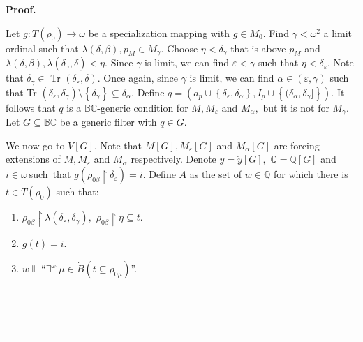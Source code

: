\documentclass{article}
\newenvironment{proof}[1][Proof]{\noindent\textbf{#1.} }{\ \rule{0.5em}{0.5em}}
\begin{document}
\begin{proof}
\qquad\qquad\qquad\qquad\ \ \ \ \qquad\ \qquad\ \ \ \ \ \qquad\ \ \ \ \ 

Let $g:T\left(  \rho_{0}\right)  \longrightarrow\omega$ be a specialization
mapping with $g\in M_{0}.$ Find $\gamma<\omega^{2}$ a limit ordinal such that
$\lambda\left(  \delta,\beta\right)  ,p_{M}\in M_{\gamma}$. Choose
$\eta<\delta_{\gamma}$ that is above $p_{M}$ and $\lambda\left(  \delta
,\beta\right)  ,\lambda\left(  \delta_{\gamma},\delta\right)  <\eta.$ Since
$\gamma$ is limit, we can find $\varepsilon<\gamma$ such that $\eta
<\delta_{\varepsilon}.$ Note that $\delta_{\gamma}\in$ \textsf{Tr}%
$(\delta_{\varepsilon},\delta).$ Once again, since $\gamma$ is limit, we can
find $\alpha\in\left(  \varepsilon,\gamma\right)  $ such that \textsf{Tr}%
$(\delta_{\varepsilon},\delta_{\gamma})\setminus\left\{  \delta_{\gamma
}\right\}  \subseteq\delta_{\alpha}.$ Define $q=(a_{p}\cup\left\{
\delta_{\varepsilon},\delta_{\alpha}\right\}  ,I_{p}\cup\left\{
(\delta_{\alpha},\delta_{\gamma}]\right\}  ).$ It follows that $q$ is a
$\mathbb{BC}$-generic condition for $M,M_{\varepsilon}$ and $M_{\alpha},$ but
it is not for $M_{\gamma}.$ Let $G\subseteq\mathbb{BC}$ be a generic filter
with $q\in G.$

\qquad\qquad\qquad

We now go to $V\left[  G\right]  .$ Note that $M\left[  G\right]
,M_{\varepsilon}\left[  G\right]  $ and $M_{\alpha}\left[  G\right]  $ are
forcing extensions of $M,M_{\varepsilon}$ and $M_{\alpha}$ respectively.
Denote $y=\dot{y}\left[  G\right]  ,$ $\mathbb{Q=\dot{Q}}\left[  G\right]  $
and $i\in\omega\ $such\ that $g\left(  \rho_{0\beta}\upharpoonright
\delta_{\varepsilon}\right)  =i.$ Define $A$ as the set of $w\in\mathbb{Q}$
for which there is $t\in T\left(  \rho_{0}\right)  $ such that:

\begin{enumerate}
\item $\rho_{0\beta}\upharpoonright\lambda\left(  \delta_{\varepsilon}%
,\delta_{\gamma}\right)  ,$ $\rho_{0\beta}\upharpoonright\eta\subseteq t.$

\item $g\left(  t\right)  =i.$

\item $w\Vdash$\textquotedblleft$\exists^{\omega_{1}}\mu\in\dot{B}\left(
t\subseteq\rho_{0\mu}\right)  $\textquotedblright.
\end{enumerate}

\qquad\ \qquad\ \ \ \ 


\end{proof}
\end{document}
